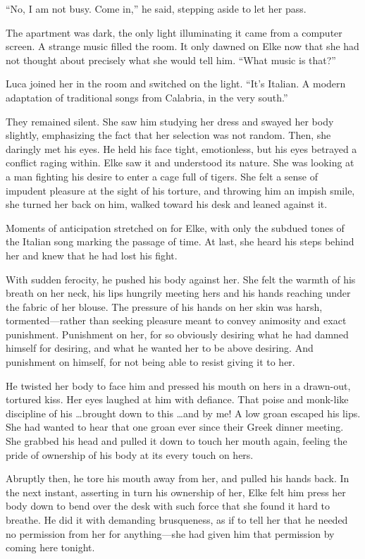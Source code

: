 ``No, I am not busy. Come in,'' he said, stepping aside to let her pass.

The apartment was dark, the only light illuminating it came from a computer screen. A strange music filled the room. It only dawned on Elke now that she had not thought about precisely what she would tell him. ``What music is that?''

Luca joined her in the room and switched on the light. ``It's Italian. A modern adaptation of traditional songs from Calabria, in the very south.''

They remained silent. She saw him studying her dress and swayed her body slightly, emphasizing the fact that her selection was not random. Then, she daringly met his eyes. He held his face tight, emotionless, but his eyes betrayed a conflict raging within. Elke saw it and understood its nature. She was looking at a man fighting his desire to enter a cage full of tigers. She felt a sense of impudent pleasure at the sight of his torture, and throwing him an impish smile, she turned her back on him, walked toward his desk and leaned against it.

Moments of anticipation stretched on for Elke, with only the subdued tones of the Italian song marking the passage of time. At last, she heard his steps behind her and knew that he had lost his fight.

With sudden ferocity, he pushed his body against her. She felt the warmth of his breath on her neck, his lips hungrily meeting hers and his hands reaching under the fabric of her blouse. The pressure of his hands on her skin was harsh, tormented---rather than seeking pleasure meant to convey animosity and exact punishment. Punishment on her, for so obviously desiring what he had damned himself for desiring, and what he wanted her to be above desiring. And punishment on himself, for not being able to resist giving it to her.

He twisted her body to face him and pressed his mouth on hers in a drawn-out, tortured kiss. Her eyes laughed at him with defiance. That poise and monk-like discipline of his \ldots brought down to this \ldots and by me! A low groan escaped his lips. She had wanted to hear that one groan ever since their Greek dinner meeting. She grabbed his head and pulled it down to touch her mouth again, feeling the pride of ownership of his body at its every touch on hers.

Abruptly then, he tore his mouth away from her, and pulled his hands back. In the next instant, asserting in turn his ownership of her, Elke felt him press her body down to bend over the desk with such force that she found it hard to breathe. He did it with demanding brusqueness, as if to tell her that he needed no permission from her for anything---she had given him that permission by coming here tonight.

